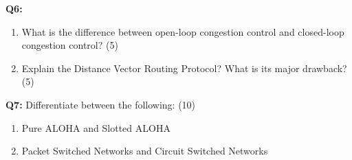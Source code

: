 \documentclass[a4paper,12pt]{article}
\begin{document}
\textbf{Q6:}
\begin{enumerate}[label=(\alph*)]
    \item What is the difference between open-loop congestion control and closed-loop congestion control? \hfill (5)
    \item Explain the Distance Vector Routing Protocol? What is its major drawback? \hfill (5)
\end{enumerate}

\textbf{Q7:}
Differentiate between the following: \hfill (10)
\begin{enumerate}[label=(\alph*)]
    \item Pure ALOHA and Slotted ALOHA
    \item Packet Switched Networks and Circuit Switched Networks
\end{enumerate}
\end{document}
